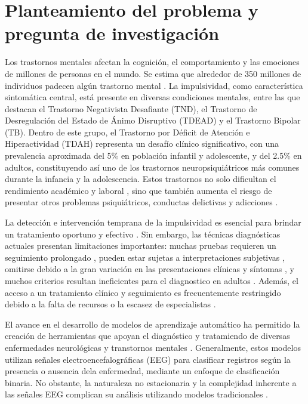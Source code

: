 
\section{Planteamiento del problema y pregunta de investigación}

Los trastornos mentales afectan la cognición, el comportamiento y las emociones de millones de personas en el mundo. Se estima que alrededor de 350 millones de individuos padecen algún trastorno mental \cite{Dehghan-Bonari2023}. La impulsividad, como característica sintomática central, está presente en diversas condiciones mentales, entre las que destacan el Trastorno Negativista Desafiante (TND), el Trastorno de Desregulación del Estado de Ánimo Disruptivo (TDEAD) y el Trastorno Bipolar (TB). Dentro de este grupo, el Trastorno por Déficit de Atención e Hiperactividad (TDAH) representa un desafío clínico significativo, con una prevalencia aproximada del 5\% en población infantil y adolescente, y del 2.5\% en adultos, constituyendo así uno de los trastornos neuropsiquiátricos más comunes durante la infancia y la adolescencia. Estos trastornos no solo dificultan el rendimiento académico y laboral \cite{Ayano2020}, sino que también aumenta el riesgo de presentar otros problemas psiquiátricos, conductas delictivas y adicciones \cite{Faraone2015}.

La detección e intervención temprana de la impulsividad es esencial para brindar un tratamiento oportuno y efectivo \cite{Kivumbi2019}. Sin embargo, las técnicas diagnósticas actuales presentan limitaciones importantes: muchas pruebas requieren un seguimiento prolongado \cite{Zhou2015-bg}, pueden estar sujetas a interpretaciones subjetivas \cite{LOHANI2023111689}, omitirse debido a la gran variación en las presentaciones clínicas y síntomas \cite{adam2013mental}, y muchos criterios resultan ineficientes para el diagnostico en adultos \cite{Sibley21042021}. Además, el acceso a un tratamiento clínico y seguimiento es frecuentemente restringido debido a la falta de recursos o la escasez de especialistas \cite{Asherson2022,Pallanti2020}.

El avance en el desarrollo de modelos de aprendizaje automático ha permitido la creación de herramientas que apoyan el diagnóstico y tratamiendo de diversas enfermedades neurológicas y transtornos mentales \cite{article}. Generalmente, estos modelos utilizan señales electroencefalográficas (EEG) para clasificar registros según la presencia o ausencia dela enfermedad, mediante un enfoque de clasificación binaria. No obstante, la naturaleza no estacionaria y la complejidad inherente a las señales EEG complican su análisis utilizando modelos tradicionales \cite{KHARE2023106676,Loh2024}.

